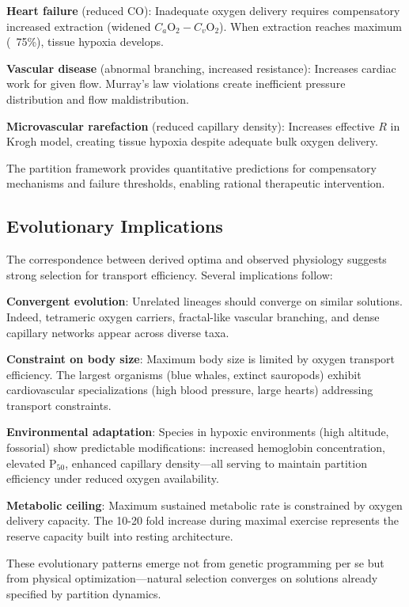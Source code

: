 \documentclass[10pt,twocolumn,a4paper]{article}
\theoremstyle{remark}
\begin{document}
\textbf{Heart failure} (reduced CO): Inadequate oxygen delivery requires compensatory increased extraction (widened $C_{a}\mathrm{O}_{2} - C_{v}\mathrm{O}_{2}$). When extraction reaches maximum (~75\%), tissue hypoxia develops.

\textbf{Vascular disease} (abnormal branching, increased resistance): Increases cardiac work for given flow. Murray's law violations create inefficient pressure distribution and flow maldistribution.

\textbf{Microvascular rarefaction} (reduced capillary density): Increases effective $R$ in Krogh model, creating tissue hypoxia despite adequate bulk oxygen delivery.

The partition framework provides quantitative predictions for compensatory mechanisms and failure thresholds, enabling rational therapeutic intervention.

\subsection{Evolutionary Implications}

The correspondence between derived optima and observed physiology suggests strong selection for transport efficiency. Several implications follow:

\textbf{Convergent evolution}: Unrelated lineages should converge on similar solutions. Indeed, tetrameric oxygen carriers, fractal-like vascular branching, and dense capillary networks appear across diverse taxa.

\textbf{Constraint on body size}: Maximum body size is limited by oxygen transport efficiency. The largest organisms (blue whales, extinct sauropods) exhibit cardiovascular specializations (high blood pressure, large hearts) addressing transport constraints.

\textbf{Environmental adaptation}: Species in hypoxic environments (high altitude, fossorial) show predictable modifications: increased hemoglobin concentration, elevated P$_{50}$, enhanced capillary density—all serving to maintain partition efficiency under reduced oxygen availability.

\textbf{Metabolic ceiling}: Maximum sustained metabolic rate is constrained by oxygen delivery capacity. The 10-20 fold increase during maximal exercise represents the reserve capacity built into resting architecture.

These evolutionary patterns emerge not from genetic programming per se but from physical optimization—natural selection converges on solutions already specified by partition dynamics.
\end{document}
